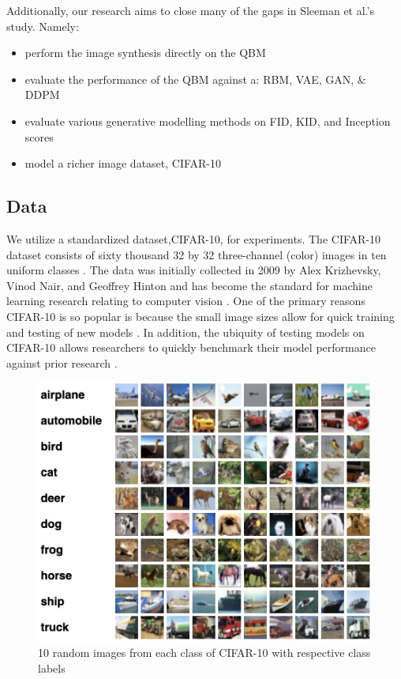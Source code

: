 \documentclass[%
 reprint,
 amsmath,amssymb,
 aps,
]{revtex4-2}
\begin{document}
Additionally, our research aims to close many of the gaps in Sleeman et al.'s study. Namely:

\begin{itemize}
    \item perform the image synthesis directly on the QBM
    \item evaluate the performance of the QBM against a: RBM, VAE, GAN, \& DDPM
    \item evaluate various generative modelling methods on FID, KID, and Inception scores
    \item model a richer image dataset, CIFAR-10
\end{itemize}

\subsection{Data}
We utilize a standardized dataset,CIFAR-10, for experiments. The CIFAR-10 dataset consists of sixty thousand 32 by 32 three-channel (color) images in ten uniform classes \cite{CIFAR}. The data was initially collected in 2009 by Alex Krizhevsky, Vinod Nair, and Geoffrey Hinton and has become the standard for machine learning research relating to computer vision \cite{Krizhevsky09learningmultiple}. One of the primary reasons CIFAR-10 is so popular is because the small image sizes allow for quick training and testing of new models \cite{ai_progress_measurement}. In addition, the ubiquity of testing models on CIFAR-10 allows researchers to quickly benchmark their model performance against prior research \cite{ai_progress_measurement}.

\begin{figure}[h]
    \includegraphics[width=0.9\columnwidth]{cifar10.jpeg}
    \caption{\label{fig:cifar10} 10 random images from each class of CIFAR-10 with respective class labels \cite{CIFAR}}
\end{figure}
\end{document}
